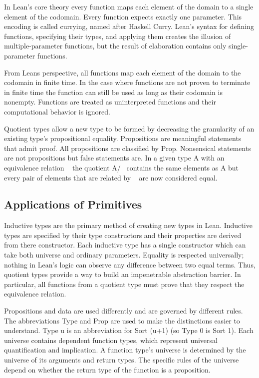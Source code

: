 \documentclass{article}
\begin{document}
In Lean’s core theory every function maps each element of the domain to a single element of the codomain. Every function expects exactly one parameter. This encoding is called currying, named after Haskell Curry. Lean's syntax for defining functions, specifying their types, and applying them creates the illusion of multiple-parameter functions, but the result of elaboration contains only single-parameter functions.

From Leans perspective, all functions map each element of the domain to the codomain in finite time. In the case where functions are not proven to terminate in finite time the function can still be used as long as their codomain is nonempty. Functions are treated as uninterpreted functions and their computational behavior is ignored. 

Quotient types allow a new type to be formed by decreasing the granularity of an existing type’s propositional equality. Propositions are meaningful statements that admit proof. All propositions are classified by Prop. Nonsensical statements are not propositions but false statements are. In a given type A with an equivalence relation ~ the quotient A/~ contains the same elements as A but every pair of elements that are related by ~ are now considered equal. 

\subsection{Applications of Primitives}

Inductive types are the primary method of creating new types in Lean. Inductive types are specified by their type constructors and their properties are derived from there constructor. Each inductive type has a single constructor which can take both universe and ordinary parameters. Equality is respected universally; nothing in Lean's logic can observe any difference between two equal terms. Thus, quotient types provide a way to build an impenetrable abstraction barrier. In particular, all functions from a quotient type must prove that they respect the equivalence relation.

Propositions and data are used differently and are governed by different rules. The abbreviations Type and Prop are used to make the distinctions easier to understand. Type u is an abbreviation for Sort (u+1) (so Type 0 is Sort 1). Each universe contains dependent function types, which represent universal quantification and implication. A function type’s universe is determined by the universe of its arguments and return types. The specific rules of the universe depend on whether the return type of the function is a proposition. 
\end{document}
